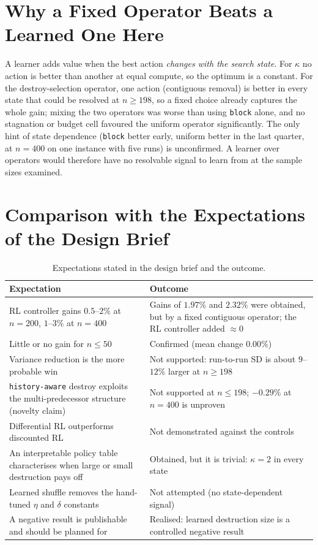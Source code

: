 \section{Why a Fixed Operator Beats a Learned One Here}

A learner adds value when the best action \emph{changes with the search state}. For $\kappa$ no action is better than another at equal compute, so the optimum is a constant. For the destroy-selection operator, one action (contiguous removal) is better in every state that could be resolved at $n\ge198$, so a fixed choice already captures the whole gain; mixing the two operators was worse than using \texttt{block} alone, and no stagnation or budget cell favoured the uniform operator significantly. The only hint of state dependence (\texttt{block} better early, uniform better in the last quarter, at $n=400$ on one instance with five runs) is unconfirmed. A learner over operators would therefore have no resolvable signal to learn from at the sample sizes examined.


\section{Comparison with the Expectations of the Design Brief}

\begin{table}[htbp]
\centering
\caption{Expectations stated in the design brief and the outcome.}
\label{tab:expectations}
\small
\begin{tabular}{P{4.4cm}P{8.6cm}}
\toprule
\textbf{Expectation} & \textbf{Outcome}\\
\midrule
RL controller gains $0.5$--$2\%$ at $n=200$, $1$--$3\%$ at $n=400$ & Gains of $1.97\%$ and $2.32\%$ were obtained, but by a fixed contiguous operator; the RL controller added $\approx0$\\
Little or no gain for $n\le50$ & Confirmed (mean change $0.00\%$)\\
Variance reduction is the more probable win & Not supported: run-to-run SD is about $9$--$12\%$ larger at $n\ge198$\\
\texttt{history-aware} destroy exploits the multi-predecessor structure (novelty claim) & Not supported at $n\le198$; $-0.29\%$ at $n=400$ is unproven\\
Differential RL outperforms discounted RL & Not demonstrated against the controls\\
An interpretable policy table characterises when large or small destruction pays off & Obtained, but it is trivial: $\kappa=2$ in every state\\
Learned shuffle removes the hand-tuned $\eta$ and $\delta$ constants & Not attempted (no state-dependent signal)\\
A negative result is publishable and should be planned for & Realised: learned destruction size is a controlled negative result\\
\bottomrule
\end{tabular}
\end{table}

